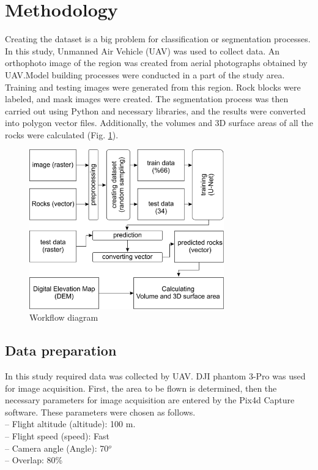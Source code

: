 \documentclass[a4paper,fleqn]{cas-sc}
\begin{document}
\section{Methodology}
Creating the dataset is a big problem for classification or segmentation processes. In this study, Unmanned Air Vehicle (UAV) was used to collect data. An orthophoto image of the region was created from aerial photographs obtained by UAV.Model building processes were conducted in a part of the study area. Training and testing images were generated from this region. Rock blocks were labeled, and mask images were created. The segmentation process was then carried out using Python and necessary libraries, and the results were converted into polygon vector files. Additionally, the volumes and 3D surface areas of all the rocks were calculated (Fig. \ref{fig:Figure3}).

\begin{figure}
	\centering
	\includegraphics[width=0.75\textwidth]{figures/fig3.jpg}
	\caption{ Workflow diagram}
	\label{fig:Figure3}
\end{figure}
\subsection{Data preparation}
In this study required data was collected by UAV. DJI phantom 3-Pro was used for image acquisition. First, the area to be flown is determined, then the necessary parameters for image acquisition are entered by the Pix4d Capture software. These parameters were chosen as follows.\\
– Flight altitude (altitude): 100 m.\\
– Flight speed (speed): Fast\\
– Camera angle (Angle): 70$^o$\\
– Overlap: 80\%\\
\end{document}
